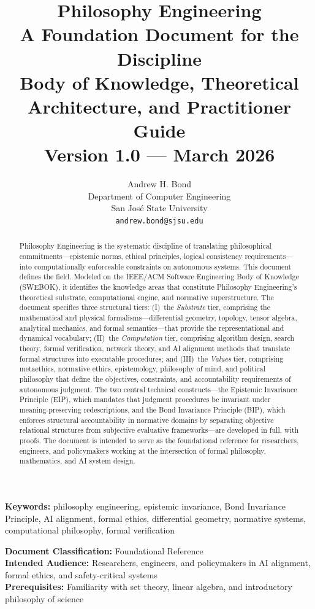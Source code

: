\documentclass[12pt,letterpaper]{article}
\title{%
\vspace{-1cm}
{\LARGE\textbf{Philosophy Engineering}}\\[0.8em]
{\Large A Foundation Document for the Discipline}\\[0.5em]
{\large Body of Knowledge, Theoretical Architecture, and Practitioner Guide}\\[1em]
{\normalsize Version 1.0 --- March 2026}
}
\author{Andrew H. Bond\\
Department of Computer Engineering\\
San Jos\'{e} State University\\
\texttt{andrew.bond@sjsu.edu}}
\date{}
\theoremstyle{definition}
\theoremstyle{plain}
\begin{document}
\maketitle
\thispagestyle{empty}

\begin{abstract}
Philosophy Engineering is the systematic discipline of translating philosophical commitments---epistemic norms, ethical principles, logical consistency requirements---into computationally enforceable constraints on autonomous systems. This document defines the field. Modeled on the IEEE/ACM Software Engineering Body of Knowledge (SWEBOK), it identifies the knowledge areas that constitute Philosophy Engineering's theoretical substrate, computational engine, and normative superstructure. The document specifies three structural tiers: (I)~the \emph{Substrate} tier, comprising the mathematical and physical formalisms---differential geometry, topology, tensor algebra, analytical mechanics, and formal semantics---that provide the representational and dynamical vocabulary; (II)~the \emph{Computation} tier, comprising algorithm design, search theory, formal verification, network theory, and AI alignment methods that translate formal structures into executable procedures; and (III)~the \emph{Values} tier, comprising metaethics, normative ethics, epistemology, philosophy of mind, and political philosophy that define the objectives, constraints, and accountability requirements of autonomous judgment. The two central technical constructs---the Epistemic Invariance Principle (EIP), which mandates that judgment procedures be invariant under meaning-preserving redescriptions, and the Bond Invariance Principle (BIP), which enforces structural accountability in normative domains by separating objective relational structures from subjective evaluative frameworks---are developed in full, with proofs. The document is intended to serve as the foundational reference for researchers, engineers, and policymakers working at the intersection of formal philosophy, mathematics, and AI system design.
\end{abstract}

\noindent\textbf{Keywords:} philosophy engineering, epistemic invariance, Bond Invariance Principle, AI alignment, formal ethics, differential geometry, normative systems, computational philosophy, formal verification

\vfill
\noindent\textbf{Document Classification:} Foundational Reference\\
\textbf{Intended Audience:} Researchers, engineers, and policymakers in AI alignment, formal ethics, and safety-critical systems\\
\textbf{Prerequisites:} Familiarity with set theory, linear algebra, and introductory philosophy of science
\end{document}
